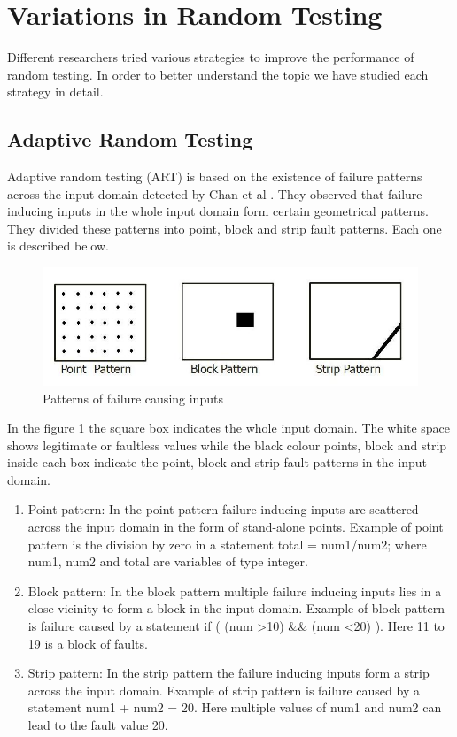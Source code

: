 \section{Variations in Random Testing}
Different researchers tried various strategies to improve the performance of random testing. In order to better understand the topic we have studied each strategy in detail.

\subsection{Adaptive Random Testing}
Adaptive random testing (ART) \cite{Chen2008} is based on the existence of failure patterns across the input domain detected by Chan et al \cite{Chan1996}. They observed that failure inducing inputs in the whole input domain form certain geometrical patterns. They divided these patterns into point, block and strip fault patterns. Each one is described below.

\begin{figure}[h]
	\centering
	\includegraphics[scale=0.5]{Literature/pointblockstrip}
	\caption{Patterns of failure causing inputs}
	\label{fig:patterns}
\end{figure}

In the figure \ref{fig:patterns} the square box indicates the whole input domain. The white space shows legitimate or faultless values while the black colour points, block and strip inside each box indicate the point, block and strip fault patterns in the input domain.

\begin{enumerate}
\item Point pattern: In the point pattern failure inducing inputs are scattered across the input domain in the form of stand-alone points. Example of point pattern is the division by zero in a statement total = num1/num2; where num1, num2 and total are variables of type integer. 
\item Block pattern: In the block pattern multiple failure inducing inputs lies in a close vicinity to form a block in the input domain. Example of block pattern is failure caused by a statement if ( (num \textgreater 10) \&\& (num \textless 20) ). Here 11 to 19 is a block of faults.
\item Strip pattern: In the strip pattern the failure inducing inputs form a strip across the input domain. Example of strip pattern is failure caused by a statement num1 + num2 = 20. Here multiple values of num1 and num2 can lead to the fault value 20.
\end{enumerate}

